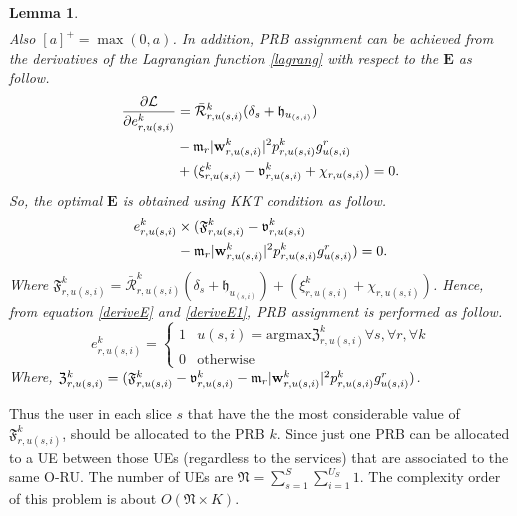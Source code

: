 \documentclass[conference]{IEEEtran}
\newtheorem{lemma}{Lemma}
\begin{document}
\begin{lemma}
\begin{equation}
\begin{split}
\end{split}
\end{equation}
Also $[a]^+ = \max(0,a)$.
In addition, PRB assignment can be achieved from the derivatives of the Lagrangian function \eqref{lagrang} with respect to the $\boldsymbol{E}$ as follow.
\begin{equation}\label{deriveE}
\begin{split}
\dfrac{\partial\mathcal{L}}{\partial e_{r,u(s,i)}^{k}} &= \mathcal{\bar{R}}_{r,u(s,i)}^{k}(\delta_s+\mathfrak{h}_{u_{(s,i)}})\\
&- \mathfrak{m}_{r}|\bold{w}_{r,u(s,i)}^{k}|^2 p_{r,u(s,i)}^{k} g_{u(s,i)}^r\\
&+( \xi^{k}_{r,u(s,i)}-\mathfrak{v}^{k}_{r,u(s,i)} +\chi_{r,u(s,i)})=0.\\
\end{split}
\end{equation}
So, the optimal $\boldsymbol{E}$ is obtained using KKT condition as follow.
\begin{equation}\label{deriveE1}
\begin{split}
e_{r,u(s,i)}^{k} &\times (\mathfrak{F}^{k}_{r,u(s,i)} -\mathfrak{v}^{k}_{r,u(s,i)}\\
& - \mathfrak{m}_{r}|\bold{w}_{r,u(s,i)}^{k}|^2 p_{r,u(s,i)}^{k} g_{u(s,i)}^r ) = 0.\\
\end{split}
\end{equation}
Where $\mathfrak{F}^{k}_{r,u(s,i)} =\mathcal{\bar{R}}_{r,u(s,i)}^{k}(\delta_s+\mathfrak{h}_{u_{(s,i)}})+( \xi^{k}_{r,u(s,i)} +\chi_{r,u(s,i)}) $.
Hence, from equation \eqref{deriveE} and \eqref{deriveE1}, PRB assignment is performed as follow.
\begin{equation}
e_{r,u(s,i)}^{k} = 
  \begin{cases}
      1 & u(s,i) = \text{argmax} \mathfrak{Z}^{k}_{r,u(s,i)} \forall s, \forall r, \forall k\\
      0 & \text{otherwise}
    \end{cases}
\end{equation}
Where, $\mathfrak{Z}^{k}_{r,u(s,i)} = (\mathfrak{F}^{k}_{r,u(s,i)} -\mathfrak{v}^{k}_{r,u(s,i)}- \mathfrak{m}_{r}|\bold{w}_{r,u(s,i)}^{k}|^2 p_{r,u(s,i)}^{k} g_{u(s,i)}^r )$.
 \end{lemma}
Thus the user in each slice $s$ that have the the most considerable value of $\mathfrak{F}^{k}_{r,u(s,i)}$, should be allocated to the PRB $k$. Since just one PRB can be allocated to a UE between those UEs (regardless to the services) that are associated to the same O-RU.
The number of UEs are $\mathfrak{N} = \sum_{s=1}^{S}\sum_{i=1}^{U_S}1$.
The complexity order of this problem is about $O(\mathfrak{N} \times K)$.
\end{document}
